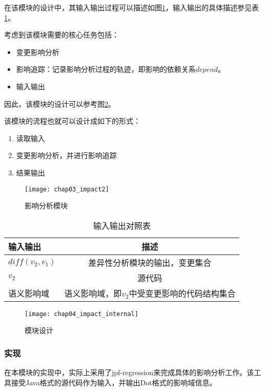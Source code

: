在该模块的设计中，其输入输出过程可以描述如图\ref {impact}，输入输出的具体描述参见表\ref {impact_io}。

考虑到该模块需要的核心任务包括：
\begin{itemize}
	\item 变更影响分析
	\item 影响追踪：记录影响分析过程的轨迹，即影响的依赖关系$depend$。
	\item 输入输出
\end{itemize}

因此，该模块的设计可以参考图\ref {des_impact}。

该模块的流程也就可以设计成如下的形式：
\begin{enumerate}
	\item 读取输入
	\item 变更影响分析，并进行影响追踪
	\item 结果输出
\end{enumerate}

\begin{figure}[H]
	\centering
	\texttt{[image: chap03\_impact2]}
	\caption {影响分析模块}
	\label {impact}	
\end{figure}


\begin{table}[H]
	\caption{输入输出对照表}
	\label{impact_io}
	\centering
	\begin{tabular}{lc}
		\toprule[1.5pt]
		{\heiti 输入输出} & {\heiti 描述} \\\midrule[1pt]
		$diff(v_2,v_1)$ & 差异性分析模块的输出，变更集合 \\
		$v_2$ & 源代码 \\
		语义影响域 & 语义影响域，即$v_2$中受变更影响的代码结构集合\\
		\bottomrule[1.5pt]
	\end{tabular}
\end{table}

\begin{figure}[H]
	\centering
	\texttt{[image: chap04\_impact\_internal]}
	\caption {模块设计}
	\label {des_impact}	
\end{figure}

\subsubsection{实现}


在本模块的实现中，实际上采用了jpf-regression来完成具体的影响分析工作。该工具接受Java格式的源代码作为输入，并输出Dot格式的影响域信息。

